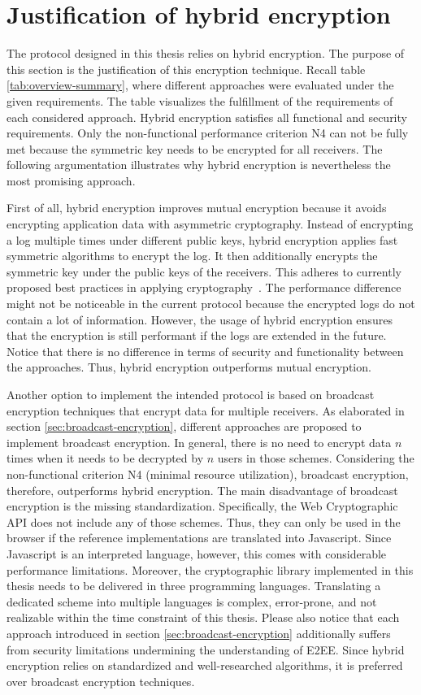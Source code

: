\documentclass[../main.tex]{subfiles}
\begin{document}
\section{Justification of hybrid encryption}
\label{sec:justification}
The protocol designed in this thesis relies on hybrid encryption.
The purpose of this section is the justification of this encryption technique.
Recall table \ref{tab:overview-summary}, where different approaches were evaluated under the given requirements.
The table visualizes the fulfillment of the requirements of each considered approach.
Hybrid encryption satisfies all functional and security requirements.
Only the non-functional performance criterion N4 can not be fully met because the symmetric key needs to be encrypted for all receivers.
The following argumentation illustrates why hybrid encryption is nevertheless the most promising approach.

First of all, hybrid encryption improves mutual encryption because it avoids encrypting application data with asymmetric cryptography.
Instead of encrypting a log multiple times under different public keys, hybrid encryption applies fast symmetric algorithms to encrypt the log.
It then additionally encrypts the symmetric key under the public keys of the receivers.
This adheres to currently proposed best practices in applying cryptography~\cite[340]{Eckert2018}.
The performance difference might not be noticeable in the current protocol because the encrypted logs do not contain a lot of information.
However, the usage of hybrid encryption ensures that the encryption is still performant if the logs are extended in the future.
Notice that there is no difference in terms of security and functionality between the approaches.
Thus, hybrid encryption outperforms mutual encryption.

Another option to implement the intended protocol is based on broadcast encryption techniques that encrypt data for multiple receivers.
As elaborated in section \ref{sec:broadcast-encryption}, different approaches are proposed to implement broadcast encryption.
In general, there is no need to encrypt data $n$ times when it needs to be decrypted by $n$ users in those schemes.
Considering the non-functional criterion N4 (minimal resource utilization), broadcast encryption, therefore, outperforms hybrid encryption.
The main disadvantage of broadcast encryption is the missing standardization.
Specifically, the Web Cryptographic API does not include any of those schemes.
Thus, they can only be used in the browser if the reference implementations are translated into Javascript.
Since Javascript is an interpreted language, however, this comes with considerable performance limitations.
Moreover, the cryptographic library implemented in this thesis needs to be delivered in three programming languages.
Translating a dedicated scheme into multiple languages is complex, error-prone, and not realizable within the time constraint of this thesis.
Please also notice that each approach introduced in section \ref{sec:broadcast-encryption} additionally suffers from security limitations undermining the understanding of E2EE.
Since hybrid encryption relies on standardized and well-researched algorithms, it is preferred over broadcast encryption techniques.
\end{document}
